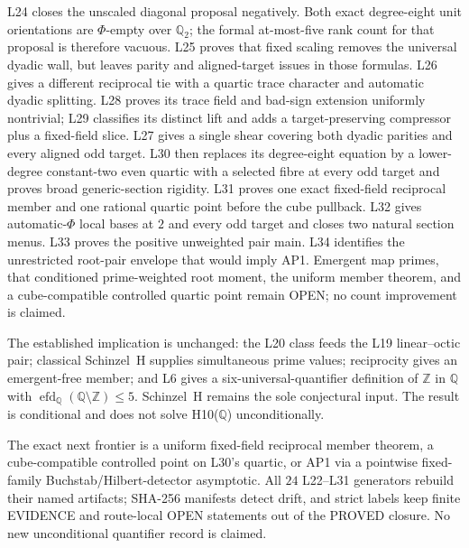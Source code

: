 \documentclass[11pt]{amsart}%
\newcommand{\Q}{\mathbb{Q}}
\newcommand{\Z}{\mathbb{Z}}
\begin{document}
L24 closes the unscaled diagonal proposal negatively.  Both exact
degree-eight unit orientations are \(\Phi\)-empty over \(\Q_2\); the
formal at-most-five rank count for that proposal is therefore vacuous.
L25 proves that fixed scaling removes the universal dyadic wall, but
leaves parity and aligned-target issues in those formulas.  L26 gives a
different reciprocal tie with a quartic trace character and automatic
dyadic splitting.  L28 proves its trace field and bad-sign extension
uniformly nontrivial; L29 classifies its distinct lift and adds a
target-preserving compressor plus a fixed-field slice.  L27 gives a
single shear covering both dyadic parities and every aligned odd target.
L30 then replaces its degree-eight equation by a lower-degree
constant-two even quartic with a selected fibre at every odd target and
proves broad generic-section rigidity.  L31 proves one exact fixed-field
reciprocal member and one rational quartic point before the cube
pullback.  L32 gives automatic-\(\Phi\) local bases at \(2\) and every
odd target and closes two natural section menus.  L33 proves the
positive unweighted pair main.  L34 identifies the unrestricted
root-pair envelope that would imply AP1.  Emergent map primes, that
conditioned prime-weighted root moment, the uniform member theorem, and
a cube-compatible controlled quartic point remain OPEN; no count
improvement is claimed.

The established implication is unchanged: the L20 class feeds the L19
linear--octic pair; classical Schinzel~H supplies simultaneous prime
values; reciprocity gives an emergent-free member; and L6 gives a
six-universal-quantifier definition of $\Z$ in $\Q$ with
$\operatorname{efd}_{\Q}(\Q\setminus\Z)\le5$.  Schinzel~H remains the
sole conjectural input.  The result is conditional and does not solve
H10($\Q$) unconditionally.

The exact next frontier is a uniform fixed-field reciprocal member
theorem, a cube-compatible controlled point on L30's quartic, or AP1
via a pointwise fixed-family Buchstab/Hilbert-detector asymptotic.  All
\(24\) L22--L31 generators rebuild their named artifacts; SHA-256
manifests detect drift, and strict labels keep finite EVIDENCE and
route-local OPEN statements out of the PROVED closure.  No new
unconditional quantifier record is claimed.
\end{document}
